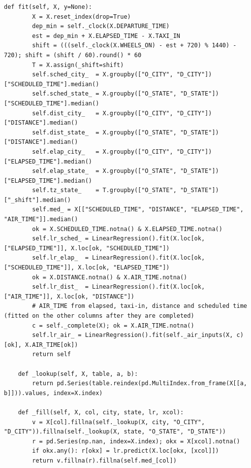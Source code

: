\documentclass[12pt,a4paper]{article}
\begin{document}
\begin{lstlisting}[style=code]
    def fit(self, X, y=None):
        X = X.reset_index(drop=True)
        dep_min = self._clock(X.DEPARTURE_TIME)
        est = dep_min + X.ELAPSED_TIME - X.TAXI_IN
        shift = (((self._clock(X.WHEELS_ON) - est + 720) % 1440) - 720); shift = (shift / 60).round() * 60
        T = X.assign(_shift=shift)
        self.sched_city_  = X.groupby(["O_CITY", "D_CITY"])["SCHEDULED_TIME"].median()
        self.sched_state_ = X.groupby(["O_STATE", "D_STATE"])["SCHEDULED_TIME"].median()
        self.dist_city_   = X.groupby(["O_CITY", "D_CITY"])["DISTANCE"].median()
        self.dist_state_  = X.groupby(["O_STATE", "D_STATE"])["DISTANCE"].median()
        self.elap_city_   = X.groupby(["O_CITY", "D_CITY"])["ELAPSED_TIME"].median()
        self.elap_state_  = X.groupby(["O_STATE", "D_STATE"])["ELAPSED_TIME"].median()
        self.tz_state_    = T.groupby(["O_STATE", "D_STATE"])["_shift"].median()
        self.med_ = X[["SCHEDULED_TIME", "DISTANCE", "ELAPSED_TIME", "AIR_TIME"]].median()
        ok = X.SCHEDULED_TIME.notna() & X.ELAPSED_TIME.notna()
        self.lr_sched_ = LinearRegression().fit(X.loc[ok, ["ELAPSED_TIME"]], X.loc[ok, "SCHEDULED_TIME"])
        self.lr_elap_  = LinearRegression().fit(X.loc[ok, ["SCHEDULED_TIME"]], X.loc[ok, "ELAPSED_TIME"])
        ok = X.DISTANCE.notna() & X.AIR_TIME.notna()
        self.lr_dist_  = LinearRegression().fit(X.loc[ok, ["AIR_TIME"]], X.loc[ok, "DISTANCE"])
        # AIR_TIME from elapsed, taxi-in, distance and scheduled time (fitted on the other columns after they are completed)
        c = self._complete(X); ok = X.AIR_TIME.notna()
        self.lr_air_ = LinearRegression().fit(self._air_inputs(X, c)[ok], X.AIR_TIME[ok])
        return self

    def _lookup(self, X, table, a, b):
        return pd.Series(table.reindex(pd.MultiIndex.from_frame(X[[a, b]])).values, index=X.index)

    def _fill(self, X, col, city, state, lr, xcol):
        v = X[col].fillna(self._lookup(X, city, "O_CITY", "D_CITY")).fillna(self._lookup(X, state, "O_STATE", "D_STATE"))
        r = pd.Series(np.nan, index=X.index); okx = X[xcol].notna()
        if okx.any(): r[okx] = lr.predict(X.loc[okx, [xcol]])
        return v.fillna(r).fillna(self.med_[col])


\end{lstlisting}
\end{document}
